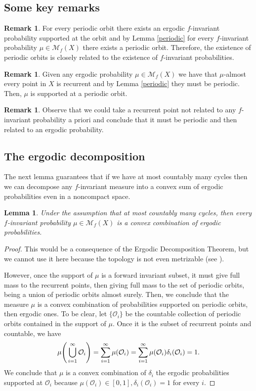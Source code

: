 \documentclass[12 pt]{amsart}
\newtheorem{lemma}[theorem]{Lemma}
\theoremstyle{definition}
\newtheorem{remark}[theorem]{Remark}
\begin{document}
	\subsection{Some key remarks}
	\begin{remark}
		For every periodic orbit there exists an ergodic $f$-invariant probability supported at the orbit and by Lemma \ref{periodic} for every $f$-invariant probability $\mu \in \mathcal{M}_{f}(X)$ there exists a periodic orbit. Therefore, the existence of periodic orbits is closely related to the existence of $f$-invariant probabilities.
	\end{remark}
		
	\begin{remark}
		Given any ergodic probability $\mu \in \mathcal{M}_{f}(X)$ we have that $\mu$-almost every point in $X$ is recurrent and by Lemma \ref{periodic} they must be periodic. Then, $\mu$ is supported at a periodic orbit.
	\end{remark}
	
	\begin{remark}
		Observe that we could take a recurrent point not related to any $f$-invariant probability a priori and conclude that it must be periodic and then related to an ergodic probability.
	\end{remark}
	
	\subsection{The ergodic decomposition}
	The next lemma guarantees that if we have at most countably many cycles then we can decompose any $f$-invariant measure into a convex sum of ergodic probabilities even in a noncompact space.
	\begin{lemma}\label{decomposition}
		Under the assumption that at most countably many cycles, then every $f$-invariant probability $\mu \in \mathcal{M}_{f}(X)$ is a convex combination of ergodic probabilities.
	\end{lemma}
	\begin{proof}
		This would be a consequence of the Ergodic Decomposition Theorem, but we cannot use it here because the topology is not even metrizable (see \cite{OliveiraViana2016}).
		
		However, once the support of $\mu$ is a forward invariant subset, it must give full mass to the recurrent points, then giving full mass to the set of periodic orbits, being a union of periodic orbits almost surely. Then, we conclude that the measure $\mu$ is a convex combination of probabilities supported on periodic orbits, then ergodic ones.
		To be clear, let $\{\mathcal{O}_{i}\}$ be the countable collection of periodic orbits contained in the support of $\mu$. Once it is the subset of recurrent points and countable, we have
		\[
		\mu\Bigg{(}\bigcup_{i=1}^{\infty}\mathcal{O}_{i}\Bigg{)} = \sum_{i=1}^{\infty}\mu(\mathcal{O}_{i})= \sum_{i=1}^{\infty}\mu(\mathcal{O}_{i}) \delta_{i}(\mathcal{O}_{i})=1.
		\]
		We conclude that $\mu$ is a convex combination of $\delta_{i}$ the ergodic probabilities supported at $\mathcal{O}_{i}$ because $\mu(\mathcal{O}_{i}) \in [0,1], \delta_{i}(\mathcal{O}_{i}) = 1$ for every $i$.
	\end{proof}
\end{document}
